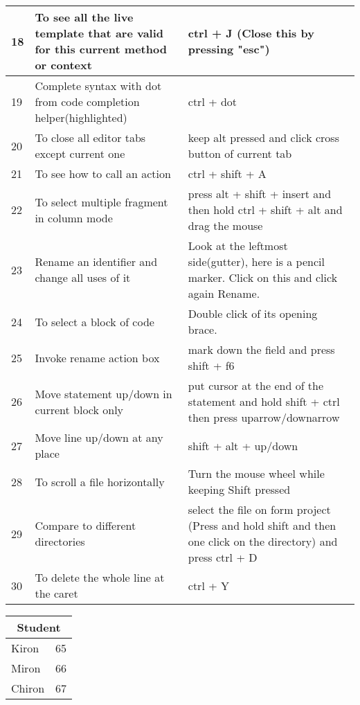 \documentclass[11 pt]{article}
\begin{document}
\begin{center}
\begin{longtable}{|| m{1 em} || m{15 em} m{17 em} ||}
		\hline
		18 & To see all the live template that are valid for this current method or context & ctrl + J (Close this by pressing "esc")\\
		\hline
		19 & Complete syntax with dot from code completion helper(highlighted) & ctrl + dot\\
		\hline
		20 & To close all editor tabs except current one & keep alt pressed and click cross button of current tab\\
		\hline
		21 & To see how to call an action & ctrl + shift + A\\
		\hline
		22 & To select multiple fragment in column mode & press alt + shift + insert and then hold ctrl + shift + alt and drag the mouse\\
		\hline
		23 & Rename an identifier and change all uses of it & Look at the leftmost side(gutter), here is a pencil marker. Click on this and click again Rename.\\
		\hline
		24 & To select a block of code & Double click of its opening brace.\\
		\hline
		25 & Invoke rename action box & mark down the field and press shift + f6\\
		\hline
		26 & Move statement up/down in current block only & put cursor at the end of the statement and hold shift + ctrl then press uparrow/downarrow\\
		\hline
		27 & Move line up/down at any place & shift + alt + up/down\\
		\hline
		28 & To scroll a file horizontally & Turn the mouse wheel while keeping Shift pressed\\
		\hline
		29 & Compare to different directories & select the file on form project (Press and hold shift and then one click on the directory) and press ctrl + D\\
		\hline
		30 & To delete the whole line at the caret & ctrl + Y\\
		\hline\hline
	\end{longtable}
\end{center}


\begin{tabular}{| p{5 em} | p{5 em} |}
	\hline\hline
	\multicolumn{2}{c}{Student}\\
	\hline\hline
	Kiron & 65\\
	\hline
	Miron & 66\\
	\hline
	Chiron & 67\\
	\hline
\end{tabular}
\end{document}
